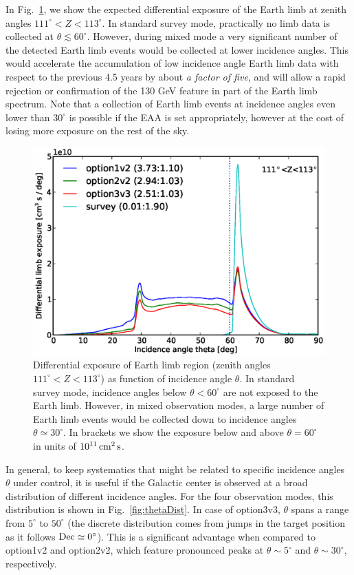 \documentclass[aps,prd,superscriptaddress,nofootinbib,fixlfloat, 12pt]{revtex4-1}
\begin{document}
In Fig.~\ref{fig:limb_exposure}, we show the expected differential exposure of
the Earth limb at zenith angles $111^\circ<Z<113^\circ$. In standard survey
mode, practically no limb data is collected at $\theta\lesssim60^\circ$.
However, during mixed mode a very significant number of the detected Earth
limb events would be collected at lower incidence angles. This would
accelerate the accumulation of low incidence angle Earth limb data with
respect to the previous 4.5 years by about \emph{a factor of five}, and will
allow a rapid rejection or confirmation of the 130 GeV feature in part of the
Earth limb spectrum. Note that a collection of Earth limb events at incidence
angles even lower than $30^\circ$ is possible if the EAA is set appropriately,
however at the cost of losing more exposure on the rest of the sky.

\begin{figure}[t]
  \begin{center}
    \includegraphics[width=0.6\linewidth]{plots/limb_exposure.eps}
    \vspace{-0.5cm}
  \end{center}
  \caption{Differential exposure of Earth limb region (zenith angles
    $111^\circ<Z<113^\circ$) as function of incidence angle $\theta$. In
    standard survey mode, incidence angles below $\theta<60^\circ$ are not
    exposed to the Earth limb. However, in mixed observation modes, a
    large number of Earth limb events would be collected down to incidence
    angles $\theta\simeq30^\circ$. In brackets we show the exposure below and
  above $\theta=60^\circ$ in units of $10^{11}\rm\,cm^2\,s$.}
  \label{fig:limb_exposure}
\end{figure}

In general, to keep systematics that might be related to specific incidence
angles $\theta$ under control, it is useful if the Galactic center is observed
at a broad distribution of different incidence angles. For the four
observation modes, this distribution is shown in
Fig.~\ref{fig:thetaDist}. In case of option3v3, $\theta$ spans a range from
$5^\circ$ to $50^\circ$ (the discrete distribution comes from jumps in the
target position as it follows $\rm Dec\simeq0^\circ$). This is a significant
advantage
when compared to option1v2 and option2v2, which feature pronounced peaks at
$\theta\sim5^\circ$ and $\theta\sim30^\circ$, respectively.
\end{document}
